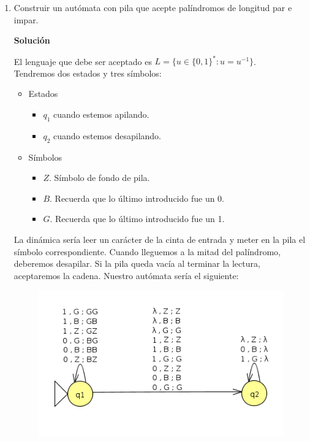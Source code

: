 \documentclass[12pt,spanish]{article}
\newenvironment{solution}{
	\par
	\textbf{Solución}
	\par
	\begin{center}
}
{
	\end{center}
}
\begin{document}
\begin{enumerate}
	\item Construir un autómata con pila que acepte palíndromos de longitud par e impar.
	\begin{solution}
		El lenguaje que debe ser aceptado es $L=\{u \in \{0,1\}^{*} : u=u^{-1}\}$.\\
		Tendremos dos estados y tres símbolos:
		\begin{itemize}
			\item Estados
				\begin{itemize}
					\item $q_1$ cuando estemos apilando.
					\item $q_2$ cuando estemos desapilando.
			\end{itemize}
			\item Símbolos
			\begin{itemize}
				\item $Z$. Símbolo de fondo de pila.
				\item $B$. Recuerda que lo último introducido fue un 0.
				\item $G$. Recuerda que lo último introducido fue un 1.
		\end{itemize}
	\end{itemize}
	La dinámica sería leer un carácter de la cinta de entrada y meter en la pila el símbolo correspondiente. Cuando lleguemos a la mitad del palíndromo, deberemos desapilar. Si la pila queda vacía al terminar la lectura, aceptaremos la cadena.
	Nuestro autómata sería el siguiente:
		\begin{figure}[H]
			\centering
			\includegraphics{ej4.png}
		\end{figure}
	\end{solution}
\end{enumerate}
\end{document}
